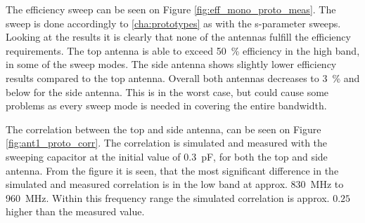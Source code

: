 The efficiency sweep can be seen on Figure \ref{fig:eff_mono_proto_meas}. The sweep is done accordingly to \ref{cha:prototypes} as with the s-parameter sweeps. Looking at the results it is clearly that none of the antennas fulfill the efficiency requirements. The top antenna is able to exceed \SI{50}{\percent} efficiency in the high band, in some of the sweep modes. The side antenna shows slightly lower efficiency results compared to the top antenna. Overall both antennas decreases to \SI{3}{\percent} and below for the side antenna. This is in the worst case, but could cause some problems as every sweep mode is needed in covering the entire bandwidth. 

The correlation between the top and side antenna, can be seen on Figure \ref{fig:ant1_proto_corr}. The correlation is simulated and measured with the sweeping capacitor at the initial value of \SI{0.3}{pF}, for both the top and side antenna. From the figure it is seen, that the most significant difference in the simulated and measured correlation is in the low band at approx. \SI{830}{MHz} to \SI{960}{MHz}. Within this frequency range the simulated correlation is approx. $0.25$ higher than the measured value.

